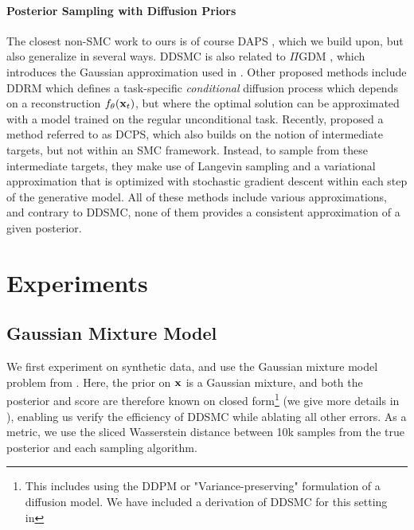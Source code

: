 \documentclass{proc}
\begin{document}
\paragraph{Posterior Sampling with Diffusion Priors}
The closest non-SMC work to ours is of course DAPS \cite{zhang_improving_2024}, which we build upon, but also generalize in several ways. DDSMC is also related to $\Pi$GDM \citep{song2023pseudoinverseguided}, which introduces the Gaussian approximation used in . %
Other proposed methods include DDRM \cite{kawar_denoising_2022} which defines a task-specific \emph{conditional} diffusion process which depends on a reconstruction $f_\theta(\mathbf{x}_{t})$, but where the optimal solution can be approximated with a model trained on the regular unconditional task. Recently, \citet{janati_divide-and-conquer_2024} proposed a method referred to as DCPS, which also builds on the notion of intermediate targets, but not within an SMC framework. Instead, to sample from these intermediate targets, they make use of Langevin sampling and a variational approximation that is optimized with stochastic gradient descent within each step of the generative model. 
All of these methods include various approximations, and contrary to DDSMC, none of them provides a consistent approximation of a given posterior. 


\section{Experiments}
\subsection{Gaussian Mixture Model}
\label{sec:gmm_exp}
We first experiment on synthetic data, and use the Gaussian mixture model problem from \citet{cardoso_monte_2023-2}. Here, the prior on $\mathbf{x}$ is a Gaussian mixture, and both the posterior and score are therefore known on closed form\footnote{This includes using the DDPM \citep{ho_denoising_2020-2} or "Variance-preserving" formulation of a diffusion model. We have included a derivation of DDSMC for this setting in } (we give more details in ), enabling us verify the efficiency of DDSMC while ablating all other errors. As a metric, we use the sliced Wasserstein distance \cite{flamary_pot_2021} between 10k samples from the true posterior and each sampling algorithm. 




\end{document}
